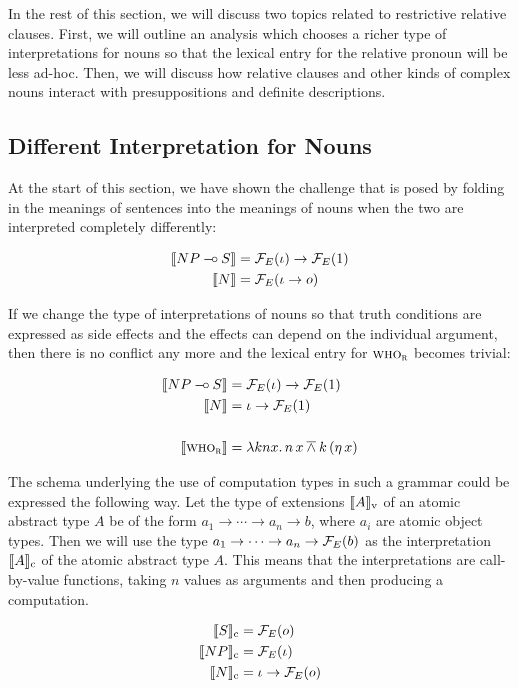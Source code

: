 In the rest of this section, we will discuss two topics related to
restrictive relative clauses. First, we will outline an analysis which
chooses a richer type of interpretations for nouns so that the lexical
entry for the relative pronoun will be less ad-hoc. Then, we will discuss how
relative clauses and other kinds of complex nouns interact with
presuppositions and definite descriptions.


\subsection{Different Interpretation for Nouns}
\label{ssec:different-nouns}

At the start of this section, we have shown the challenge that is posed by
folding in the meanings of sentences into the meanings of nouns when the
two are interpreted completely differently:

\begin{align*}
  \llbracket NP \mathbin{{-}\mkern-3.5mu{\circ}} S \rrbracket &= \mathcal{F}_E(\iota) \to \mathcal{F}_E(1) \\
  \llbracket N \rrbracket &= \mathcal{F}_E(\iota \to o)
\end{align*}

If we change the type of interpretations of nouns so that truth conditions
are expressed as side effects and the effects can depend on the individual
argument, then there is no conflict any more and the lexical entry for
$\textsc{who}_{\textsc{r}}$ becomes trivial:

\begin{align*}
  \llbracket NP \mathbin{{-}\mkern-3.5mu{\circ}} S \rrbracket &= \mathcal{F}_E(\iota) \to \mathcal{F}_E(1) \\
  \llbracket N \rrbracket &= \iota \to \mathcal{F}_E(1) \\
  \\
  \llbracket \textsc{who}_{\textsc{r}} \rrbracket &= \lambda k n x.\, n\,x \mathbin{\overline{\land}} k\,(\eta\,x)
\end{align*}

The schema underlying the use of computation types in such a grammar could
be expressed the following way. Let the type of extensions
$\llbracket A \rrbracket_{\mathrm{v}}$ of an atomic abstract type $A$ be of the form
$a_1 \to \cdots \to a_n \to b$, where $a_i$ are atomic object types. Then
we will use the type $a_1 \to \cdots \to a_n \to \mathcal{F}_E(b)$ as the
interpretation $\llbracket A \rrbracket_{\mathrm{c}}$ of the atomic abstract type $A$. This
means that the interpretations are call-by-value functions, taking $n$
values as arguments and then producing a computation.

\begin{align*}
  \llbracket S \rrbracket_{\mathrm{c}} &= \mathcal{F}_E(o) \\
  \llbracket NP \rrbracket_{\mathrm{c}} &= \mathcal{F}_E(\iota) \\
  \llbracket N \rrbracket_{\mathrm{c}} &= \iota \to \mathcal{F}_E(o)
\end{align*}


